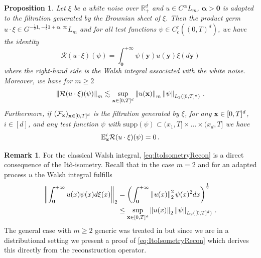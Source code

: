 \documentclass[12pt]{article}
\numberwithin{equation}{section}
\theoremstyle{plain}
\newtheorem{proposition}[theorem]{Proposition}
\theoremstyle{definition}
\newtheorem{remark}[theorem]{Remark}
\newcommand{\norm}[1]{\left\Vert #1\right\Vert}
\def\cR{\mathcal{R}}\def\cE{\mathcal{E}}
\def\bE{\mathbb{E}}\def\bW{\mathbb{W}}
\def\fy{\mathbf y}\def\fz{\mathbf z}
\def\falpha{{\boldsymbol\alpha}}
\def\foo{{\boldsymbol 0}}
\def\fone{{\boldsymbol 1}}
\def\supp{\mbox{supp}}
\begin{document}
\begin{proposition}\label{prop:ItoRecon}
    Let  $\xi$ be a white noise over $\mathbb R^d_+$ and $u\in C^{\falpha}L_m$, $\falpha> \foo$ is adapted to the filtration generated by the Brownian sheet  of $\xi$. Then the product germ $u\cdot \xi\in G^{-\frac 12\fone,-\frac 12\fone+\falpha, \infty}L_m$ and for all test functions $\psi\in C^r_c((0,T)^d) $, we have the identity
    \[\mathcal{R}(u \cdot\xi)(\psi)= \int_{\foo}^{+ \infty}\psi(\fy) u(\fy)\xi(d\fy) \]
    where the right-hand side is the Walsh integral associated with the white noise. Moreover, we have for $m\geq 2$
\begin{equation}\label{eq:ItoIsometryRecon}
        \norm{\mathcal{R}(u \cdot\xi)(\psi)}_{m} \lesssim \sup_{\fx\in[0,T]^d}\norm{u(\fx)}_m\norm{\psi}_{L_2([0,T]^d)}\,.
    \end{equation}
    Furthermore, if $(\mathcal{F}_\mathbf x)_{\mathbf x\in[0,T]^d}$ is the filtration generated by $\xi$, for any $\mathbf x\in[0,T]^d$, $i\in[d]$, and any test function $\psi$ with $\supp(\psi)\subset(x_1,T]\times\dots\times(x_d,T]$ we have 
\begin{equation}\label{eq:CondExpectationRuXi}
        \bE^i_\fx \cR(u\cdot\xi)(\psi) = 0\,.
    \end{equation}
\end{proposition}

\begin{remark}
    For the classical Walsh integral, \eqref{eq:ItoIsometryRecon} is a direct consequence of the Itô-isometry. Recall that in the case $m=2$ and for an adapted process $u$ the Walsh integral fulfills
    \begin{align*}
        \norm{\int_{\foo}^{+\infty} u(x) \psi(x) d\xi(x)}_2 &= \left(\int_{\foo}^{+\infty} \norm{u(x)}_2^2 \psi(x)^2 dx \right)^{\frac 12} \\
        &\le \sup_{\fx\in[0,T]^d} \norm{u(x)}_2 \norm{\psi}_{L_2([0,T]^d)}\,.
    \end{align*}
The general case with $m\geq 2$ generic was treated in \cite{Cairoli1970} but since we are in a distributional setting we present a proof of \eqref{eq:ItoIsometryRecon} which derives this directly from the reconstruction operator.
\end{remark}
\end{document}
